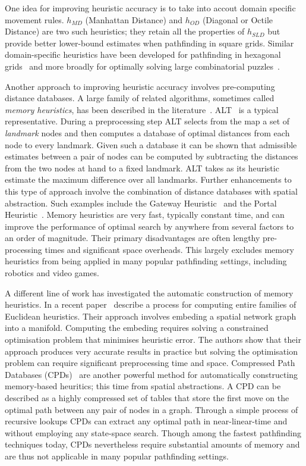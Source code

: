 One idea for improving heuristic accuracy is to take into accout domain specific movement rules.
$h_{MD}$ (Manhattan Distance) and $h_{OD}$ (Diagonal or Octile Distance) are two such heuristics; they
retain all the properties of $h_{SLD}$ but provide better lower-bound estimates when pathfinding in
square grids. Similar domain-specific heuristics have been developed for pathfinding in hexagonal
grids~\citep{yap02} and more broadly for optimally solving large combinatorial puzzles~\citep{korf96}.

Another approach to improving heuristic accuracy involves pre-computing distance databases.  A
large family of related algorithms, sometimes called \emph{memory heuristics}, has been described in
the literature~\citep{goldberg05,bjornsson06,sturtevant07,felner09,goldenberg10,anderson10}.
ALT~\citep{goldberg05} is a typical representative. During a preprocessing step ALT selects from the
map a set of \emph{landmark} nodes and then computes a database of optimal distances from each node
to every landmark. Given such a database it can be shown that admissible estimates between a pair
of nodes can be computed by subtracting the distances from the two nodes at hand to a fixed landmark.
ALT takes as its heuristic estimate the maximum difference over all landmarks.  
Further enhancements to this type of approach involve the combination of distance databases with
spatial abstraction. Such examples include the Gateway Heuristic~\citep{bjornsson06} and the 
Portal Heuristic~\citep{goldenberg10}. Memory heuristics are very fast, typically constant time, 
and can improve the performance of optimal search by anywhere from several factors to an order of
magnitude. Their primary disadvantages are often lengthy pre-processing times and significant space
overheads.  This largely excludes memory heuristics from being applied in many popular pathfinding
settings, including robotics and video games.

A different line of work has investigated the automatic construction of memory heuristics.  In a
recent paper~\cite{rayner11} describe a process for computing entire families of Euclidean
heuristics. Their approach involves embeding a spatial network graph into a manifold. Computing the
embeding requires solving a constrained optimisation problem that minimises heuristic error. The
authors show that their approach produces very accurate results in practice but solving the
optimisation problem can require significant preprocessing time and space.  Compressed Path
Databases (CPDs)~\citep{sanka05,botea11,botea13} are another powerful method for automatically
constructing memory-based heuritics; this time from spatial abstractions.  A CPD can be described as
a highly compressed set of tables that store the first move on the optimal path between any pair of
nodes in a graph. Through a simple process of recursive lookups CPDs can extract any optimal path in
near-linear-time and without employing any state-space search. Though among the fastest pathfinding
techniques today, CPDs nevertheless require substantial amounts of memory and are thus not
applicable in many popular pathfinding settings.

